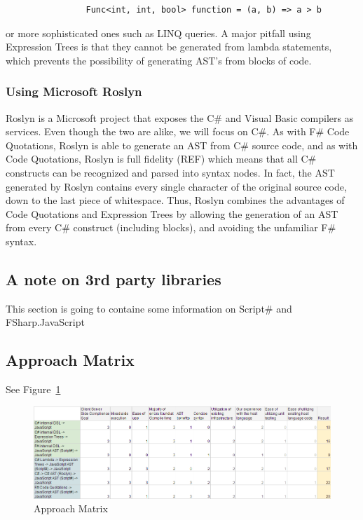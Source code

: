 			\begin{lstlisting}
				Func<int, int, bool> function = (a, b) => a > b
			\end{lstlisting}

			or more sophisticated ones such as LINQ queries.  A major pitfall using Expression Trees is that they cannot be generated from lambda statements, which prevents the possibility of generating AST’s from blocks of code.

		\subsubsection{Using Microsoft Roslyn}
			Roslyn is a Microsoft project that exposes the C\# and Visual Basic compilers as services. Even though the two are alike, we will focus on C\#. As with F\# Code Quotations, Roslyn is able to generate an AST from C\# source code, and as with Code Quotations, Roslyn is full fidelity (REF) which means that all C\# constructs can be recognized and parsed into syntax nodes. In fact, the AST generated by Roslyn contains every single character of the original source code, down to the last piece of whitespace. Thus, Roslyn combines the advantages of Code Quotations and Expression Trees by allowing the generation of an AST from every C\# construct (including blocks), and avoiding the unfamiliar F\# syntax.


	\subsection{A note on 3rd party libraries} %
		\label{sub:a_note_on_3rd_party_libraries}
		This section is going to containe some information on Script\# and FSharp.JavaScript

	\subsection{Approach Matrix} %
		\label{sub:approach_matrix}
		See Figure~\ref{ApproachMatrix}

		\begin{figure}
			\begin{center}
				\centerline{\includegraphics[width=18cm]{resources/images/ApproachMatrix.png}}
			\end{center}
			\caption{Approach Matrix}
			\label{ApproachMatrix}
		\end{figure}
		

